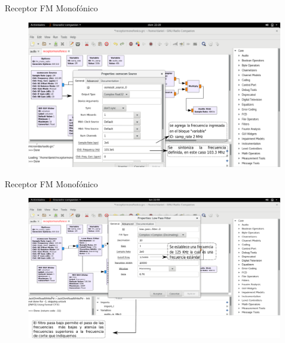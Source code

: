 \begin{frame}{Receptor FM Monofónico}

\begin{figure}[H]
\centering
\vspace{-3mm}
\includegraphics[width=\textwidth]{parte3/lab8/pdf/lab8_2.pdf}
\end{figure}

\end{frame}

\begin{frame}{Receptor FM Monofónico}

\begin{figure}[H]
\centering
\vspace{-3mm}
\includegraphics[width=\textwidth]{parte3/lab8/pdf/lab8_3.pdf}
\end{figure}

\end{frame}

